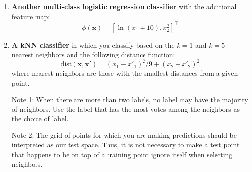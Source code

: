 \documentclass[submit]{../harvardml}
\begin{document}
\begin{problem}
\begin{enumerate}[label=\alph*)]
  \item \textbf{Another multi-class logistic regression classifier} with the additional feature map:
  $$\phi(\bm x) = [\ln (x_1+10), x_2^2]^\top$$

  \item \textbf{A kNN classifier} in which you classify based on the $k = 1$ and $k = 5$ nearest neighbors and the following distance function: 
  \[\text{dist}(\boldsymbol{x}, \boldsymbol{x}') = (x_1 - x'_1)^2/9 + (x_2 - x'_2)^2\]
        where nearest neighbors are those with the smallest distances from a given point.

        Note 1: When there are more than two labels, no label may have the
        majority of neighbors.  Use the label that has the most votes among
        the neighbors as the choice of label.

        Note 2: The grid of points for which you are making predictions
        should be interpreted as our test space.  Thus, it is not necessary
        to make a test point that happens to be on top of a training point
        ignore itself when selecting neighbors.

\end{enumerate}
\end{problem}

\newpage
\end{document}
